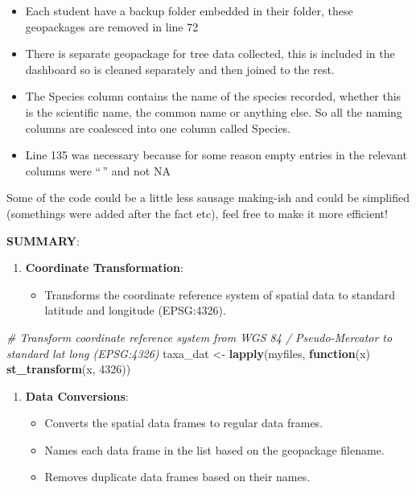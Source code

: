\documentclass[
]{book}
\newenvironment{Shaded}{\begin{snugshade}}{\end{snugshade}}
\newcommand{\CommentTok}[1]{\textcolor[rgb]{0.56,0.35,0.01}{\textit{#1}}}
\newcommand{\ControlFlowTok}[1]{\textcolor[rgb]{0.13,0.29,0.53}{\textbf{#1}}}
\newcommand{\DecValTok}[1]{\textcolor[rgb]{0.00,0.00,0.81}{#1}}
\newcommand{\FunctionTok}[1]{\textcolor[rgb]{0.13,0.29,0.53}{\textbf{#1}}}
\newcommand{\NormalTok}[1]{#1}
\newcommand{\OtherTok}[1]{\textcolor[rgb]{0.56,0.35,0.01}{#1}}
\providecommand{\tightlist}{%
  \setlength{\itemsep}{0pt}\setlength{\parskip}{0pt}}
\begin{document}
\begin{itemize}
\tightlist
\item
  Each student have a backup folder embedded in their folder, these geopackages are removed in line 72
\item
  There is separate geopackage for tree data collected, this is included in the dashboard so is cleaned separately and then joined to the rest.
\item
  The Species column contains the name of the species recorded, whether this is the scientific name, the common name or anything else. So all the naming columns are coalesced into one column called Species.
\item
  Line 135 was necessary because for some reason empty entries in the relevant columns were ``\,'' and not NA
\end{itemize}

Some of the code could be a little less sausage making-ish and could be simplified (somethings were added after the fact etc), feel free to make it more efficient!

\textbf{SUMMARY}:

\begin{enumerate}
\def\labelenumi{\arabic{enumi}.}
\tightlist
\item
  \textbf{Coordinate Transformation}:

  \begin{itemize}
  \tightlist
  \item
    Transforms the coordinate reference system of spatial data to standard latitude and longitude (EPSG:4326).
  \end{itemize}
\end{enumerate}

\begin{Shaded}
\begin{Highlighting}[]
\CommentTok{\# Transform coordinate reference system from WGS 84 / Pseudo{-}Mercator to standard lat long (EPSG:4326)}
\NormalTok{taxa\_dat }\OtherTok{\textless{}{-}} \FunctionTok{lapply}\NormalTok{(myfiles, }\ControlFlowTok{function}\NormalTok{(x) }\FunctionTok{st\_transform}\NormalTok{(x, }\DecValTok{4326}\NormalTok{))}
\end{Highlighting}
\end{Shaded}

\begin{enumerate}
\def\labelenumi{\arabic{enumi}.}
\setcounter{enumi}{1}
\tightlist
\item
  \textbf{Data Conversions}:

  \begin{itemize}
  \tightlist
  \item
    Converts the spatial data frames to regular data frames.
  \item
    Names each data frame in the list based on the geopackage filename.
  \item
    Removes duplicate data frames based on their names.
  \end{itemize}
\end{enumerate}
\end{document}
